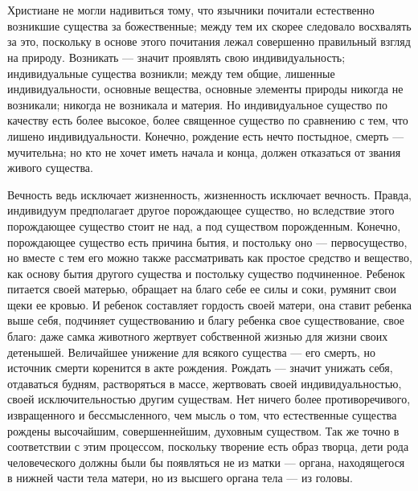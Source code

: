 \documentclass[12pt]{article}
\begin{document}
\section{}

Христиане не могли надивиться тому, что язычники почитали естественно возникшие существа за божественные; между тем их скорее следовало восхвалять за это, поскольку в основе этого почитания лежал совершенно правильный взгляд на природу. Возникать --- значит проявлять свою индивидуальность; индивидуальные существа возникли; между тем общие, лишенные индивидуальности, основные вещества, основные элементы природы никогда не возникали; никогда не возникала и материя. Но индивидуальное существо по качеству есть более высокое, более священное существо по сравнению с тем, что лишено индивидуальности. Конечно, рождение есть нечто постыдное, смерть --- мучительна; но кто не хочет иметь начала и конца, должен отказаться от звания живого существа.

Вечность ведь исключает жизненность, жизненность исключает вечность. Правда,
индивидуум предполагает  другое  порождающее существо, но  вследствие  этого
порождающее  существо стоит  не над, а под  существом  порожденным. Конечно,
порождающее существо есть причина бытия, и постольку оно --- первосущество, но
вместе с тем его можно также рассматривать как простое  средство и вещество,
как основу бытия другого существа и  постольку существо подчиненное. Ребенок
питается своей матерью, обращает на благо  себе ее силы и соки, румянит свои
щеки  ее  кровью.  И  ребенок  составляет гордость своей  матери, она ставит
ребенка   выше  себя,   подчиняет   существованию   и  благу   ребенка  свое
существование, свое  благо: даже самка животного жертвует собственной жизнью
для жизни  своих  детенышей. Величайшее  унижение для всякого существа --- его
смерть, но источник  смерти  коренится  в акте  рождения. Рождать  ---  значит
унижать себя,  отдаваться будням,  растворяться  в  массе, жертвовать  своей
индивидуальностью,  своей исключительностью  другим  существам.  Нет  ничего
более противоречивого,  извращенного и бессмысленного,  чем мысль о том, что
естественные   существа   рождены   высочайшим,   совершеннейшим,   духовным
существом. Так же точно  в соответствии с этим процессом, поскольку творение
есть образ творца, дети рода человеческого должны были бы  появляться не  из
матки  --- органа, находящегося  в нижней  части тела  матери,  но  из высшего
органа тела --- из головы.
\section{}
\end{document}
